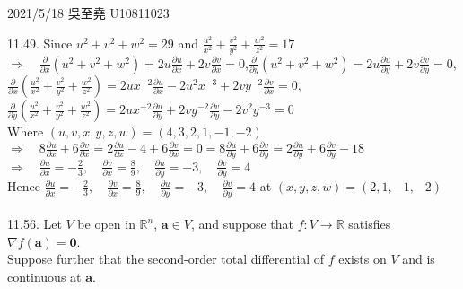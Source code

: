 \documentclass[12pt]{book}
\author{andersonwu2000}
\begin{document}
\begin{CJK}{UTF8}{bsmi}

\hfill 2021/5/18 吳至堯 U10811023

11.49. Since $\displaystyle u^2+v^2+w^2=29$ and $\displaystyle\frac{u^2}{x^2}+\frac{v^2}{y^2}+\frac{w^2}{z^2}=17$ \\
$\displaystyle\Rightarrow\quad
  \frac{\partial}{\partial x}\left( u^2+v^2+w^2 \right)
= 2u\frac{\partial u}{\partial x}+2v\frac{\partial v}{\partial x}
= 0$,\quad $\displaystyle
\frac{\partial}{\partial y}\left( u^2+v^2+w^2 \right)
= 2u\frac{\partial u}{\partial y}+2v\frac{\partial v}{\partial y}
= 0$, \\
\hspace*{2.2em}$\displaystyle
  \frac{\partial}{\partial x}\left( \frac{u^2}{x^2}+\frac{v^2}{y^2}+\frac{w^2}{z^2} \right)
= 2ux^{-2}\frac{\partial u}{\partial x}-2u^2x^{-3}+2vy^{-2}\frac{\partial v}{\partial x}
= 0$, \\ 
\hspace*{2.2em}$\displaystyle
  \frac{\partial}{\partial y}\left( \frac{u^2}{x^2}+\frac{v^2}{y^2}+\frac{w^2}{z^2} \right)
= 2ux^{-2}\frac{\partial u}{\partial y}+2vy^{-2}\frac{\partial v}{\partial y}-2v^2y^{-3}
= 0$ \\[5pt]
Where $(u, v, x, y, z, w)=(4, 3, 2, 1, -1, -2)$ \\[5pt]
$\displaystyle\Rightarrow\quad 
  8\frac{\partial u}{\partial x}+6\frac{\partial v}{\partial x}
= 2\frac{\partial u}{\partial x}-4+6\frac{\partial v}{\partial x}
= 0
= 8\frac{\partial u}{\partial y}+6\frac{\partial v}{\partial y}
= 2\frac{\partial u}{\partial y}+6\frac{\partial v}{\partial y}-18$ \\
$\displaystyle\Rightarrow\quad\frac{\partial u}{\partial x}=-\frac{2}{3},\quad\frac{\partial v}{\partial x}=\frac{8}{9},\quad\frac{\partial u}{\partial y}=-3,\quad\frac{\partial v}{\partial y}=4$ \\[5pt]
Hence $\displaystyle\frac{\partial u}{\partial x}=-\frac{2}{3},\quad\frac{\partial v}{\partial x}=\frac{8}{9},\quad\frac{\partial u}{\partial y}=-3,\quad\frac{\partial v}{\partial y}=4$ at $(x, y, z, w)=(2, 1, -1, -2)$ \\\\

11.56. Let $V$ be open in $\mathbb{R}^n$, $\mathbf{a}\in V$, and suppose that $f:V\rightarrow\mathbb{R}$ satisfies $\nabla f(\mathbf{a})=\mathbf{0}$. \\
Suppose further that the second-order total differential of $f$ exists on $V$ and is continuous at $\mathbf{a}$. \\


\end{CJK}
\end{document}
